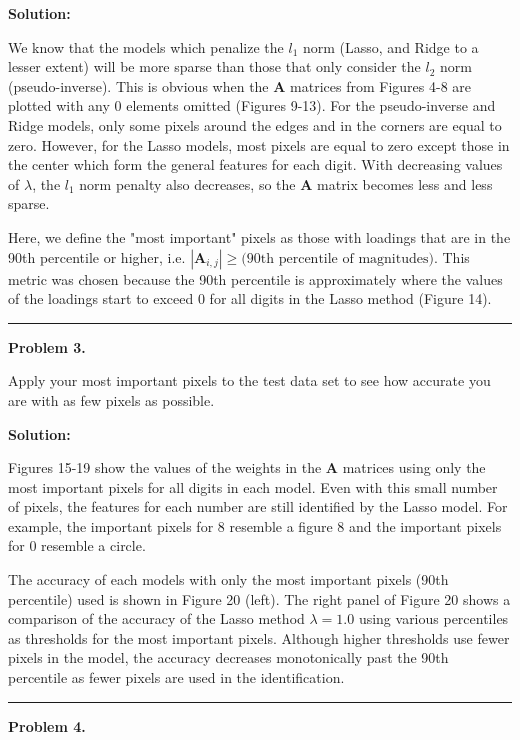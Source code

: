 \documentclass[10pt]{article}
\begin{document}
\vskip 0.5cm
{\bf Solution:}

We know that the models which penalize the $l_1$ norm (Lasso, and Ridge to a lesser extent) will be more sparse than those that only consider the $l_2$ norm (pseudo-inverse). This is obvious when the $\textbf{A}$ matrices from Figures 4-8 are plotted with any 0 elements omitted (Figures 9-13). For the pseudo-inverse and Ridge models, only some pixels around the edges and in the corners are equal to zero. However, for the Lasso models, most pixels are equal to zero except those in the center which form the general features for each digit. With decreasing values of $\lambda$, the $l_1$ norm penalty also decreases, so the $\textbf{A}$ matrix becomes less and less sparse. %

Here, we define the "most important" pixels as those with loadings that are in the 90th percentile or higher, i.e. $|\textbf{A}_{i, j}| \geq \text{(90th percentile of magnitudes)}$. This metric was chosen because the 90th percentile is approximately where the values of the loadings start to exceed 0 for all digits in the Lasso method (Figure 14). %


\vskip 1cm
\hrule
{\bf Problem 3.}

Apply your most important pixels to the test data set to see how accurate you are with as few pixels as possible.

\vskip 0.5cm
{\bf Solution:} 

Figures 15-19 show the values of the weights in the $\textbf{A}$ matrices using only the most important pixels for all digits in each model. Even with this small number of pixels, the features for each number are still identified by the Lasso model. For example, the important pixels for 8 resemble a figure 8 and the important pixels for 0 resemble a circle. %

The accuracy of each models with only the most important pixels (90th percentile) used is shown in Figure 20 (left). The right panel of Figure 20 shows a comparison of the accuracy of the Lasso method $\lambda=1.0$ using various percentiles as thresholds for the most important pixels. Although higher thresholds use fewer pixels in the model, the accuracy decreases monotonically past the 90th percentile as fewer pixels are used in the identification. %


\vskip 1cm
\hrule
{\bf Problem 4.}
\end{document}
